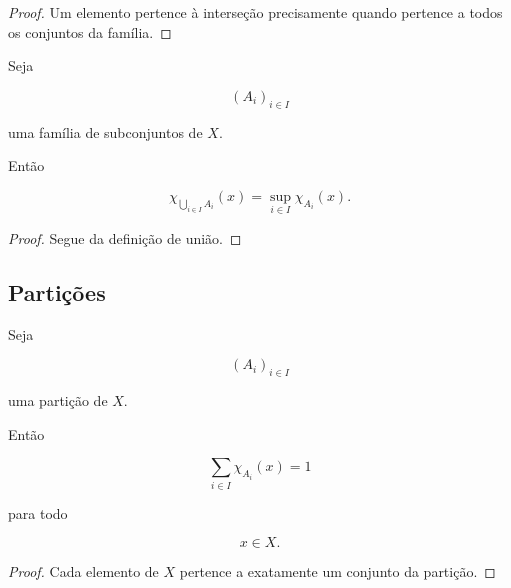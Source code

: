 \documentclass[../../main]{subfiles}
\begin{document}
\begin{proof}

	Um elemento pertence à interseção precisamente quando pertence a
	todos os conjuntos da família.

\end{proof}

\begin{prop}
	\label{prop:matematica:funcoes:caracteristicas:uniao-familia}

	Seja

	\[
		(A_i)_{i\in I}
	\]

	uma família de subconjuntos de \(X\).

	Então

	\[
		\chi_{\bigcup_{i\in I}A_i}(x)
		=
		\sup_{i\in I}
		\chi_{A_i}(x).
	\]

\end{prop}

\begin{proof}

	Segue da definição de união.

\end{proof}

\subsection{Partições}

\begin{prop}
	\label{prop:matematica:funcoes:caracteristicas:particao}

	Seja

	\[
		(A_i)_{i\in I}
	\]

	uma partição de \(X\).

	Então

	\[
		\sum_{i\in I}
		\chi_{A_i}(x)
		=
		1
	\]

	para todo

	\[
		x\in X.
	\]

\end{prop}

\begin{proof}

	Cada elemento de \(X\) pertence a exatamente um conjunto da
	partição.

\end{proof}
\end{document}
